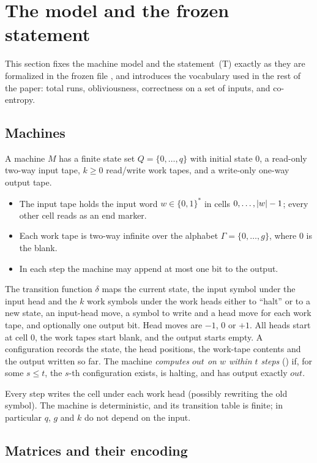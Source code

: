 \section{The model and the frozen statement}\label{sec:model}

This section fixes the machine model and the statement~(T) exactly as they are formalized in the
frozen file , and introduces the vocabulary used in the rest of
the paper: total runs, obliviousness, correctness on a set of inputs, and co-entropy.

\subsection{Machines}

A machine $M$ has a finite state set $Q=\{0,\dots,q\}$ with initial state $0$, a read-only
two-way input tape, $k\ge 0$ read/write work tapes, and a write-only one-way output tape.
\begin{itemize}[leftmargin=2em]
\item The input tape holds the input word $w\in\{0,1\}^*$ in cells $0,\dots,\lvert w \rvert-1$; every
other cell reads as an end marker.
\item Each work tape is two-way infinite over the alphabet $\Gamma=\{0,\dots,g\}$, where $0$ is the
blank.
\item In each step the machine may append at most one bit to the output.
\end{itemize}
The transition function $\delta$ maps the current state, the input symbol under the input head and
the $k$ work symbols under the work heads either to ``halt'' or to a new state, an input-head move,
a symbol to write and a head move for each work tape, and optionally one output bit. Head moves
are $-1$, $0$ or $+1$. All heads start at cell $0$, the work tapes start blank, and the output
starts empty. A configuration records the state, the head positions, the work-tape contents and the
output written so far. The machine \emph{computes $\mathit{out}$ on $w$ within $t$ steps}
() if, for some $s\le t$, the $s$-th configuration exists, is
halting, and has output exactly $\mathit{out}$.

Every step writes the cell under each work head (possibly rewriting the old symbol). The machine
is deterministic, and its transition table is finite; in particular $q$, $g$ and $k$ do not depend
on the input.

\subsection{Matrices and their encoding}

